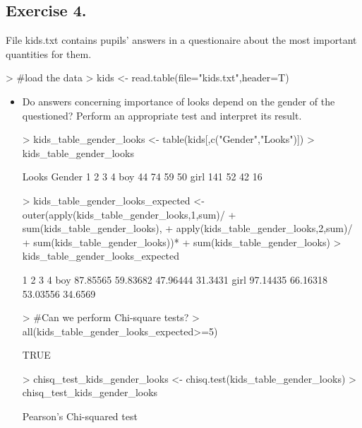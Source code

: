 \documentclass[a4paper]{article}
\begin{document}
\subsection{Exercise 4.}
File kids.txt contains pupils' answers in a questionaire about the most important quantities for them.
\begin{Schunk}
\begin{Sinput}
> #load the data
> kids <- read.table(file="kids.txt",header=T)
\end{Sinput}
\end{Schunk}
\begin{itemize}
\item Do answers concerning importance of looks depend on the gender of the questioned? Perform an appropriate test and interpret its result.
\begin{Schunk}
\begin{Sinput}
> kids_table_gender_looks <- table(kids[,c("Gender","Looks")])
> kids_table_gender_looks
\end{Sinput}
\begin{Soutput}
      Looks
Gender   1   2   3   4
  boy   44  74  59  50
  girl 141  52  42  16
\end{Soutput}
\begin{Sinput}
> kids_table_gender_looks_expected <- outer(apply(kids_table_gender_looks,1,sum)/
+                                             sum(kids_table_gender_looks),
+                                       apply(kids_table_gender_looks,2,sum)/
+                                             sum(kids_table_gender_looks))*
+   sum(kids_table_gender_looks)
> kids_table_gender_looks_expected
\end{Sinput}
\begin{Soutput}
            1        2        3       4
boy  87.85565 59.83682 47.96444 31.3431
girl 97.14435 66.16318 53.03556 34.6569
\end{Soutput}
\begin{Sinput}
> #Can we perform Chi-square tests?
> all(kids_table_gender_looks_expected>=5)
\end{Sinput}
\begin{Soutput}
[1] TRUE
\end{Soutput}
\begin{Sinput}
> chisq_test_kids_gender_looks <- chisq.test(kids_table_gender_looks)
> chisq_test_kids_gender_looks
\end{Sinput}
\begin{Soutput}
	Pearson's Chi-squared test


\end{Soutput}
\end{Schunk}
\end{itemize}
\end{document}
